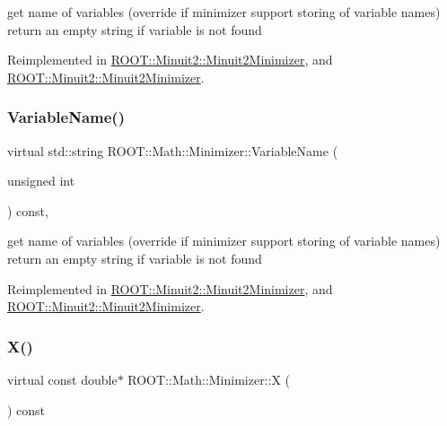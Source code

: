 get name of variables (override if minimizer support storing of variable names) return an empty string if variable is not found 

Reimplemented in \mbox{\hyperlink{classROOT_1_1Minuit2_1_1Minuit2Minimizer_a8f5a6dc65fdfeb0351039d80f7c94968}{R\+O\+O\+T\+::\+Minuit2\+::\+Minuit2\+Minimizer}}, and \mbox{\hyperlink{classROOT_1_1Minuit2_1_1Minuit2Minimizer_a8f5a6dc65fdfeb0351039d80f7c94968}{R\+O\+O\+T\+::\+Minuit2\+::\+Minuit2\+Minimizer}}.

\mbox{\label{classROOT_1_1Math_1_1Minimizer_a4d6a3c9c95608b35a25f16afd50690ad}} 
\subsubsection{\texorpdfstring{VariableName()}{VariableName()}\hspace{0.1cm}{\footnotesize\ttfamily [2/2]}}
{\footnotesize\ttfamily virtual std\+::string R\+O\+O\+T\+::\+Math\+::\+Minimizer\+::\+Variable\+Name (\begin{DoxyParamCaption}\item[{unsigned int}]{ }\end{DoxyParamCaption}) const\hspace{0.3cm}{\ttfamily [inline]}, {\ttfamily [virtual]}}

get name of variables (override if minimizer support storing of variable names) return an empty string if variable is not found 

Reimplemented in \mbox{\hyperlink{classROOT_1_1Minuit2_1_1Minuit2Minimizer_a8f5a6dc65fdfeb0351039d80f7c94968}{R\+O\+O\+T\+::\+Minuit2\+::\+Minuit2\+Minimizer}}, and \mbox{\hyperlink{classROOT_1_1Minuit2_1_1Minuit2Minimizer_a8f5a6dc65fdfeb0351039d80f7c94968}{R\+O\+O\+T\+::\+Minuit2\+::\+Minuit2\+Minimizer}}.

\mbox{\label{classROOT_1_1Math_1_1Minimizer_a35c7c2caf54e548f892d84795209edad}} 
\subsubsection{\texorpdfstring{X()}{X()}\hspace{0.1cm}{\footnotesize\ttfamily [1/2]}}
{\footnotesize\ttfamily virtual const double$\ast$ R\+O\+O\+T\+::\+Math\+::\+Minimizer\+::X (\begin{DoxyParamCaption}{ }\end{DoxyParamCaption}) const\hspace{0.3cm}{\ttfamily [pure virtual]}}



